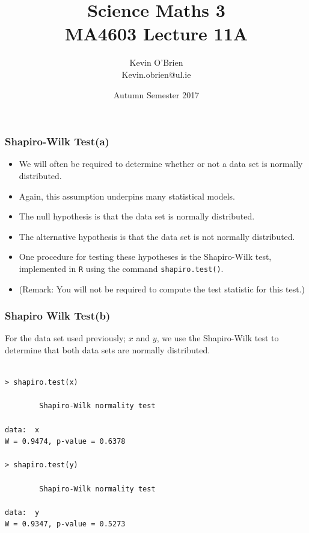 \documentclass[a4]{beamer}
\title[MA4603]{Science Maths 3 \\ {\normalsize MA4603 Lecture 11A}}
\author[Kevin O'Brien]{Kevin O'Brien \\ {\scriptsize Kevin.obrien@ul.ie}}
\date{Autumn Semester 2017}
\institute[Maths \& Stats]{Dept. of Mathematics \& Statistics, \\ University \textit{of} Limerick}
\begin{document}


\begin{frame}
\frametitle{Shapiro-Wilk Test(a)}


\begin{itemize}
\item We will often be required to determine whether or not a data set is normally distributed.
\item Again, this assumption underpins many statistical models.
\item The null hypothesis is that the data set is normally distributed.
\item The alternative hypothesis is that the data set is not normally distributed.
\item One procedure for testing these hypotheses is the Shapiro-Wilk test, implemented in \texttt{R} using the command \texttt{shapiro.test()}.
\item (Remark: You will not be required to compute the test statistic for this test.)
\end{itemize}
\end{frame}
\begin{frame}[fragile]
\frametitle{Shapiro Wilk Test(b)}
For the data set used previously; $x$ and $y$, we use the Shapiro-Wilk test to determine that both data sets are normally distributed.
\begin{verbatim}

> shapiro.test(x)

        Shapiro-Wilk normality test

data:  x
W = 0.9474, p-value = 0.6378

> shapiro.test(y)

        Shapiro-Wilk normality test

data:  y
W = 0.9347, p-value = 0.5273
\end{verbatim}

\end{frame}
\end{document}
